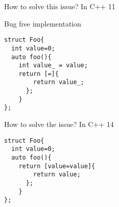 \documentclass[10pt]{beamer}
\begin{document}
\begin{frame}[fragile]{How to solve this issue?}
	\centering \alert{In C++ 11}

	 Bug free implementation

	\vfill

	\begin{verbatim}
struct Foo{
  int value=0;
  auto foo(){
    int value_ = value;
    return [=]{
        return value_;
      };
    }
};
	\end{verbatim}

\end{frame}

\begin{frame}[fragile]{How to solve the issue?}
	\centering \alert{In C++ 14}

	\begin{verbatim}
struct Foo{
  int value=0;
  auto foo(){
    return [value=value]{
        return value;
      };
    }
};
	\end{verbatim}
\end{frame}
\end{document}
